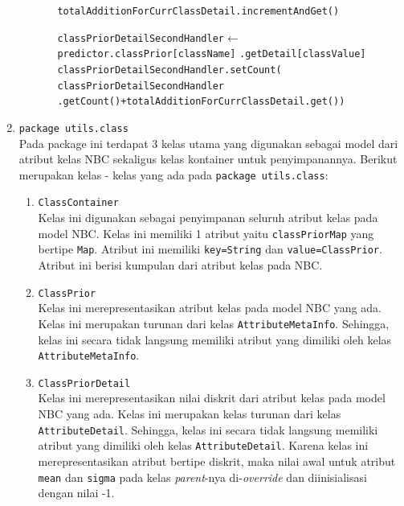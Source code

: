 \begin{enumerate}
\begin{itemize}
\begin{enumerate}
\begin{algorithm}[H]
\begin{algorithmic}[1]
								\State \texttt{totalAdditionForCurrClassDetail.incrementAndGet()}
							\EndFor
							
						\EndFor
						
						\State \texttt{classPriorDetailSecondHandler}$ \gets $ \texttt{predictor.classPrior[className]} \texttt{.getDetail[classValue]}
						\State \texttt{classPriorDetailSecondHandler.setCount(}  \texttt{classPriorDetailSecondHandler} \texttt{.getCount()+totalAdditionForCurrClassDetail.get())}
					\EndFor
				
				\EndFor
							
			\EndFor
			
			\end{algorithmic}
			\end{algorithm}
			

		\end{enumerate}						
		
	\end{itemize}

	\item{\texttt{package utils.class}}\\
	Pada package ini terdapat 3 kelas utama yang digunakan sebagai model dari atribut kelas NBC sekaligus kelas kontainer untuk penyimpanannya. Berikut merupakan kelas - kelas yang ada pada \texttt{package utils.class}:
	\begin{enumerate}
		\item \texttt{ClassContainer}\\
		Kelas ini digunakan sebagai penyimpanan seluruh atribut kelas pada model NBC. Kelas ini memiliki 1 atribut yaitu \texttt{classPriorMap} yang bertipe \texttt{Map}. Atribut ini memiliki \texttt{key=String} dan \texttt{value=ClassPrior}. Atribut ini berisi kumpulan dari atribut kelas pada NBC.

		\item \texttt{ClassPrior}\\
		Kelas ini merepresentasikan atribut kelas pada model NBC yang ada. Kelas ini merupakan turunan dari kelas \texttt{AttributeMetaInfo}. Sehingga, kelas ini secara tidak langsung memiliki atribut yang dimiliki oleh kelas \texttt{AttributeMetaInfo}.

		\item \texttt{ClassPriorDetail}\\
		Kelas ini merepresentasikan nilai diskrit dari atribut kelas pada model NBC yang ada. Kelas ini merupakan kelas turunan dari kelas \texttt{AttributeDetail}. Sehingga, kelas ini secara tidak langsung memiliki atribut yang dimiliki oleh kelas \texttt{AttributeDetail}. Karena kelas ini merepresentasikan atribut bertipe diskrit, maka nilai awal untuk atribut \texttt{mean} dan \texttt{sigma} pada kelas \textit{parent}-nya di-\textit{override} dan diinisialisasi dengan nilai -1.
		

\end{enumerate}
\end{enumerate}
